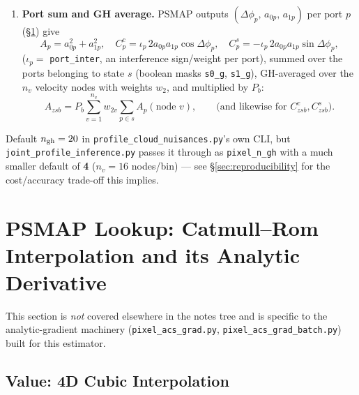 \documentclass[11pt,a4paper]{article}
\newcommand{\code}[1]{\texttt{#1}}
\begin{document}
\begin{enumerate}
  \item \textbf{Port sum and GH average.} PSMAP outputs
    $(\Delta\phi_p,\,a_{0p},\,a_{1p})$ per port $p$ (\S\ref{sec:psmap}) give
    \begin{equation}
      A_p = a_{0p}^2+a_{1p}^2,\quad
      C^c_p = \iota_p\,2a_{0p}a_{1p}\cos\Delta\phi_p,\quad
      C^s_p = -\iota_p\,2a_{0p}a_{1p}\sin\Delta\phi_p,
    \end{equation}
    ($\iota_p=$ \code{port\_inter}, an interference sign/weight per port),
    summed over the ports belonging to state $s$ (boolean masks
    \code{s0\_g}, \code{s1\_g}), GH-averaged over the $n_v$ velocity nodes
    with weights $w_2$, and multiplied by $P_b$:
    \begin{equation}
      A_{zsb} = P_b\sum_{v=1}^{n_v} w_{2v}\sum_{p\in s} A_{p}(\text{node }v),
      \qquad\text{(and likewise for }C^c_{zsb}, C^s_{zsb}\text{)}.
    \end{equation}
\end{enumerate}

Default $n_{\rm gh}=20$ in \code{profile\_cloud\_nuisances.py}'s own CLI,
but \code{joint\_profile\_inference.py} passes it through as
\code{pixel\_n\_gh} with a much smaller default of \textbf{4}
($n_v=16$ nodes/bin) --- see \S\ref{sec:reproducibility} for the
cost/accuracy trade-off this implies.

\section{PSMAP Lookup: Catmull--Rom Interpolation and its Analytic Derivative}
\label{sec:psmap}

This section is \emph{not} covered elsewhere in the notes tree and is
specific to the analytic-gradient machinery
(\code{pixel\_acs\_grad.py}, \code{pixel\_acs\_grad\_batch.py}) built for
this estimator.

\subsection{Value: 4D Cubic Interpolation}
\end{document}
